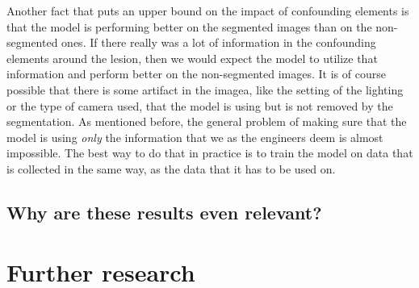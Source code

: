 Another fact that puts an upper bound on the impact of confounding elements is that the model
is performing better on the segmented images than on the non-segmented ones.
If there really was a lot of information in the confounding elements around the lesion,
then we would expect the model to utilize that information and perform better on the non-segmented images.
It is of course possible that there is some artifact in the imagea, like the setting of the lighting or the type of camera used,
that the model is using but is not removed by the segmentation.
As mentioned before, the general problem of making sure that the model is using \textit{only} the information that we as 
the engineers deem  is almost impossible.
The best way to do that in practice is to train the model on data that is collected in the same way,
as the data that it has to be used on.

\subsection{Why are these results even relevant?}



\section{Further research}

